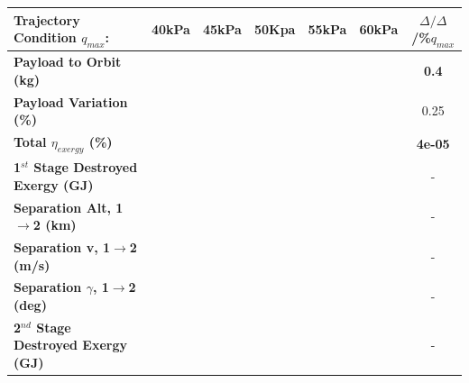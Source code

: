 \begin{table}[ht]
	\centering
	\begin{tabular}{l c c c c c c} 
		\hline \textbf{Trajectory Condition}   \qquad  $q_{max}$:
		&40kPa
		&45kPa
		&50Kpa
		&55kPa
		&60kPa
		& $\Delta/\Delta$/\%$q_{max}$
		\\
		\hline \textbf{Payload to Orbit (kg)}
		& \textbf{\PayloadToOrbitqForty}
		& \textbf{\PayloadToOrbitqFortyFive}
		& \textbf{\PayloadToOrbitqStandard}
		& \textbf{\PayloadToOrbitqFiftyFive}
		& \textbf{\PayloadToOrbitqSixty}
		&\textbf{0.4}
		\\
		\textbf{Payload Variation (\%)}
		& \PayloadVarqForty
		& \PayloadVarqFortyFive
		& \PayloadVarqStandard
		& \PayloadVarqFiftyFive
		& \PayloadVarqSixty
		&0.25
		\\
		\textbf{Total $\eta_{exergy}$ (\%)}
		& \textbf{\totalExergyEffqForty}
		& \textbf{\totalExergyEffqFortyFive}
		& \textbf{\totalExergyEffqStandard}
		& \textbf{\totalExergyEffqFiftyFive}
		& \textbf{\totalExergyEffqSixty}
		& \textbf{4e-05}
		\\
		\hline 
		\textbf{1$^{st}$ Stage Destroyed Exergy (GJ)}
		& \textbf{\firstExergyDestroyedqForty}
		& \textbf{\firstExergyDestroyedqFortyFive}
		& \textbf{\firstExergyDestroyedqStandard}
		& \textbf{\firstExergyDestroyedqFiftyFive}
		& \textbf{\firstExergyDestroyedqSixty}
		& -
		\\
		\textbf{Separation Alt, 1$\rightarrow$2 (km)}
		& \firstsecondSeparationAltqForty
		& \firstsecondSeparationAltqFortyFive
		& \firstsecondSeparationAltqStandard
		& \firstsecondSeparationAltqFiftyFive
		& \firstsecondSeparationAltqSixty
		& -
		\\
		\textbf{Separation v, 1$\rightarrow$2 (m/s)}
		& \firstsecondSeparationvqForty
		& \firstsecondSeparationvqFortyFive
		& \firstsecondSeparationvqStandard
		& \firstsecondSeparationvqFiftyFive
		& \firstsecondSeparationvqSixty
		& -
		\\
		\textbf{Separation $\gamma$, 1$\rightarrow$2 (deg)}
		& \firstsecondSeparationgammaqForty
		& \firstsecondSeparationgammaqFortyFive
		& \firstsecondSeparationgammaqStandard
		& \firstsecondSeparationgammaqFiftyFive
		& \firstsecondSeparationgammaqSixty
		& -
		\\
		\hline 
		\textbf{2$^{nd}$ Stage Destroyed Exergy (GJ)}
		& \textbf{\secondExergyDestroyedqForty}
		& \textbf{\secondExergyDestroyedqFortyFive}
		& \textbf{\secondExergyDestroyedqStandard}
		& \textbf{\secondExergyDestroyedqFiftyFive}
		& \textbf{\secondExergyDestroyedqSixty}
		& -
		\\

\end{tabular}
\end{table}
